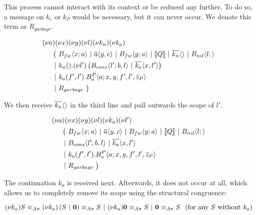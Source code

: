 This process cannot interact with its context or be reduced any further.
To do so, a message on $k_c$ or $k_P$ would be necessary, but it can never occur.
We denote this term as $R_{garbage}$.

\begin{align*}
  &\anew{a}{\anew{x}{\anew{y}{\anew{l}{\anew{k_n}{\anew{k_a}{ \\
    &\hspace{0.5cm}
    \begin{aligned}[t]
      \big(\ &\ains{B_{fw}}{x}{a}
      \apar   \asnd{a}{y,c}
      \apar   \ains{B_{fw}}{y}{a}
      \apar   \encMJtoAP{Q}
      \apar   \asnd{k_n}{}
      \apar   \ains{B_{nil}}{l}{}
      \\
      \apar  &\arcv{k_n}{} . \anew{l'}{\parens{\ains{B_{cons}}{l'}{b, l} \apar \asnd{k_a}{x, l'}}}
      \\
      \apar  &\arcv{k_a}{f',l'} . \ains{B_a^P}{a}{x, y, f', l',\tilde{z}_P}
      \\
      \apar  &R_{garbage}
      \ \big)
    \end{aligned}
  }}}}}}
\end{align*}

We then receive $\overline{k_n}\langle\rangle$ in the third line
and pull outwards the scope of $l'$.

\begin{align*}
  &\anew{a}{\anew{x}{\anew{y}{\anew{l}{\anew{k_a}{\anew{l'}{ \\
    &\hspace{0.5cm}
    \begin{aligned}[t]
      \big(\ &\ains{B_{fw}}{x}{a}
      \apar   \asnd{a}{y,c}
      \apar   \ains{B_{fw}}{y}{a}
      \apar   \encMJtoAP{Q}
      \apar   \ains{B_{nil}}{l}{}
      \\
      \apar  &\ains{B_{cons}}{l'}{b, l}
      \apar   \asnd{k_a}{x, l'}
      \\
      \apar  &\arcv{k_a}{f',l'} . \ains{B_a^P}{a}{x, y, f', l',\tilde{z}_P}
      \\
      \apar  &R_{garbage}
      \ \big)
    \end{aligned}
  }}}}}}
\end{align*}

The continuation $k_a$ is received next. Afterwards, it does not occur at all,
which allows us to completely remove its scope using the structural congruence:

$ \anew{k_a}{S}
  \astructequ \anew*{k_a}{S \apar \anullproc}
  \astructequ S \apar \anew{k_a}{\anullproc}
  \astructequ S \apar \anullproc
  \astructequ S
  \text{ \ (for any $S$ without $k_a$)} $

